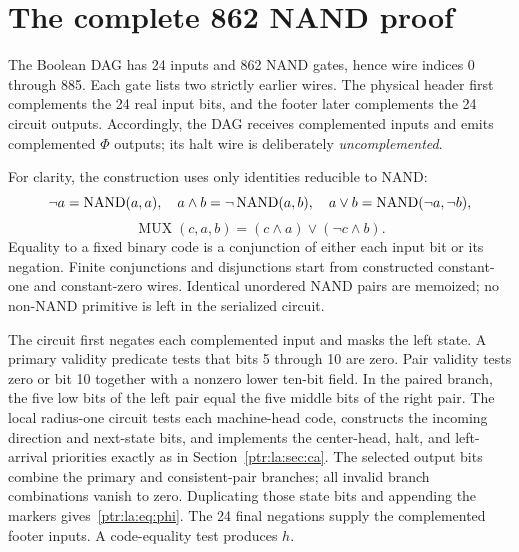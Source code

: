\documentclass[11pt,letterpaper]{article}
\theoremstyle{definition}\newtheorem{definition}[theorem]{Definition}
\theoremstyle{remark}\newtheorem{remark}[theorem]{Remark}
\begin{document}
\section{The complete 862 NAND proof}\label{ptr:la:sec:boolean}
The Boolean DAG has 24 inputs and 862 NAND gates, hence wire indices 0 through 885. Each gate lists two strictly earlier wires. The physical header first complements the 24 real input bits, and the footer later complements the 24 circuit outputs. Accordingly, the DAG receives complemented inputs and emits complemented $\Phi$ outputs; its halt wire is deliberately \emph{uncomplemented}.

For clarity, the construction uses only identities reducible to NAND:
\[
 \neg a=\operatorname{NAND}(a,a),\quad
 a\wedge b=\neg\operatorname{NAND}(a,b),\quad
 a\vee b=\operatorname{NAND}(\neg a,\neg b),
\]
\[
 \operatorname{MUX}(c,a,b)=(c\wedge a)\vee(\neg c\wedge b).
\]
Equality to a fixed binary code is a conjunction of either each input bit or its negation. Finite conjunctions and disjunctions start from constructed constant-one and constant-zero wires. Identical unordered NAND pairs are memoized; no non-NAND primitive is left in the serialized circuit.

The circuit first negates each complemented input and masks the left state. A primary validity predicate tests that bits 5 through 10 are zero. Pair validity tests zero or bit 10 together with a nonzero lower ten-bit field. In the paired branch, the five low bits of the left pair equal the five middle bits of the right pair. The local radius-one circuit tests each machine-head code, constructs the incoming direction and next-state bits, and implements the center-head, halt, and left-arrival priorities exactly as in Section~\ref{ptr:la:sec:ca}. The selected output bits combine the primary and consistent-pair branches; all invalid branch combinations vanish to zero. Duplicating those state bits and appending the markers gives~\eqref{ptr:la:eq:phi}. The 24 final negations supply the complemented footer inputs. A code-equality test produces $h$.
\end{document}
